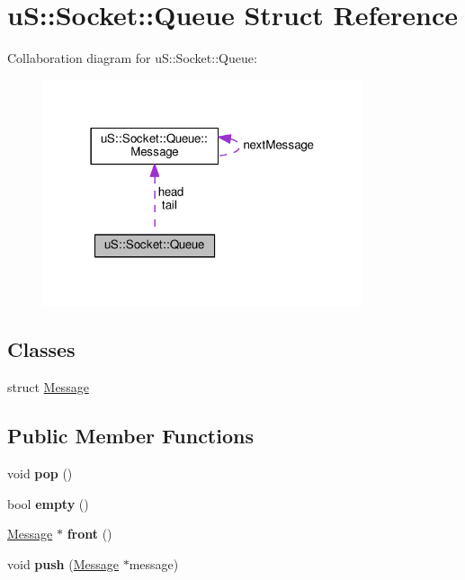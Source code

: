 \hypertarget{structu_s_1_1_socket_1_1_queue}{}\section{uS\+:\+:Socket\+:\+:Queue Struct Reference}
\label{structu_s_1_1_socket_1_1_queue}


Collaboration diagram for uS\+:\+:Socket\+:\+:Queue\+:
\nopagebreak
\begin{figure}[H]
\begin{center}
\leavevmode
\includegraphics[width=266pt]{structu_s_1_1_socket_1_1_queue__coll__graph}
\end{center}
\end{figure}
\subsection*{Classes}
\begin{DoxyCompactItemize}
\item 
struct \mbox{\hyperlink{structu_s_1_1_socket_1_1_queue_1_1_message}{Message}}
\end{DoxyCompactItemize}
\subsection*{Public Member Functions}
\begin{DoxyCompactItemize}
\item 
\mbox{\label{structu_s_1_1_socket_1_1_queue_a09eda935ea88dcacd615dce16e686c71}} 
void {\bfseries pop} ()
\item 
\mbox{\label{structu_s_1_1_socket_1_1_queue_a928b04554103229ea672d9f3f8020747}} 
bool {\bfseries empty} ()
\item 
\mbox{\label{structu_s_1_1_socket_1_1_queue_ad770e4a9f5e9d7827bd8beff325fe598}} 
\mbox{\hyperlink{structu_s_1_1_socket_1_1_queue_1_1_message}{Message}} $\ast$ {\bfseries front} ()
\item 
\mbox{\label{structu_s_1_1_socket_1_1_queue_aa0930c1a958c4b2e1d2aeb6b43b60021}} 
void {\bfseries push} (\mbox{\hyperlink{structu_s_1_1_socket_1_1_queue_1_1_message}{Message}} $\ast$message)
\end{DoxyCompactItemize}
